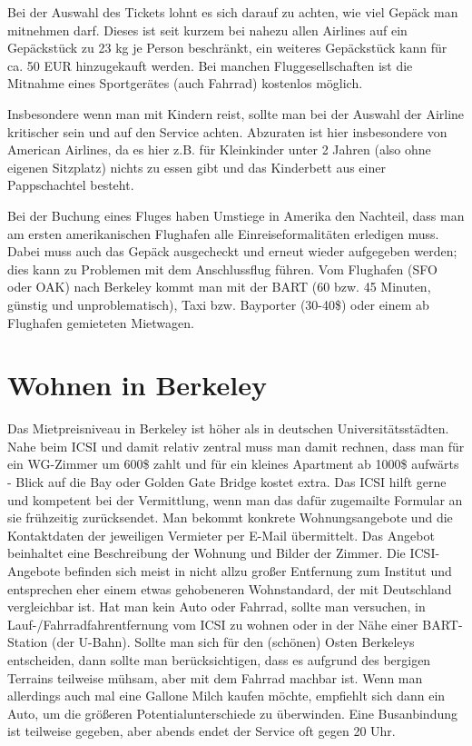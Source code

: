 \documentclass[a4paper]{scrreprt}
\begin{document}
Bei der Auswahl des Tickets lohnt es sich darauf zu achten, wie viel Gepäck man mitnehmen darf. Dieses ist seit kurzem bei nahezu allen Airlines auf ein Gepäckstück zu 23 kg je Person beschränkt, ein weiteres Gepäckstück kann für ca. 50 EUR hinzugekauft werden. Bei manchen Fluggesellschaften ist die Mitnahme eines Sportgerätes (auch Fahrrad) kostenlos möglich.

Insbesondere wenn man mit Kindern reist, sollte man bei der Auswahl der Airline kritischer sein und auf den Service achten. Abzuraten ist hier insbesondere von American Airlines, da es hier z.B. für Kleinkinder unter 2 Jahren (also ohne eigenen Sitzplatz) nichts zu essen gibt und das Kinderbett aus einer Pappschachtel besteht.

Bei der Buchung eines Fluges haben Umstiege in Amerika den Nachteil, dass man am ersten amerikanischen Flughafen alle Einreiseformalitäten erledigen muss. Dabei muss auch das Gepäck ausgecheckt und erneut wieder aufgegeben werden; dies kann zu Problemen mit dem Anschlussflug führen. Vom Flughafen (SFO oder OAK) nach Berkeley kommt man mit der BART (60 bzw. 45 Minuten, günstig und unproblematisch), Taxi bzw. Bayporter (30-40\$) oder einem ab Flughafen gemieteten Mietwagen.
 
\section{Wohnen in Berkeley}

Das Mietpreisniveau in Berkeley ist höher als in deutschen Universitätsstädten. Nahe beim ICSI und damit relativ
zentral muss man damit rechnen, dass man für ein WG-Zimmer um 600\$ zahlt und für ein kleines Apartment ab 1000\$ aufwärts - Blick auf die Bay oder Golden Gate Bridge kostet extra. Das ICSI hilft gerne und kompetent bei der Vermittlung, wenn man das dafür zugemailte Formular an sie frühzeitig zurücksendet. Man bekommt konkrete Wohnungsangebote und die Kontaktdaten der jeweiligen Vermieter per E-Mail übermittelt. Das Angebot beinhaltet eine Beschreibung der Wohnung und Bilder der Zimmer. Die ICSI-Angebote befinden sich meist in nicht allzu großer Entfernung zum Institut und entsprechen eher einem etwas gehobeneren Wohnstandard, der mit Deutschland vergleichbar ist. Hat man kein Auto oder Fahrrad, sollte man versuchen, in Lauf-/Fahrradfahrentfernung vom ICSI zu wohnen oder in der Nähe einer BART-Station (der U-Bahn). Sollte man sich für den (schönen) Osten Berkeleys entscheiden, dann sollte man berücksichtigen, dass es aufgrund des bergigen Terrains teilweise mühsam, aber mit dem Fahrrad machbar ist. Wenn man allerdings auch mal eine Gallone Milch kaufen möchte, empfiehlt sich dann ein Auto, um die größeren Potentialunterschiede zu überwinden. Eine Busanbindung ist teilweise gegeben, aber abends endet der Service oft gegen 20 Uhr.
\end{document}
